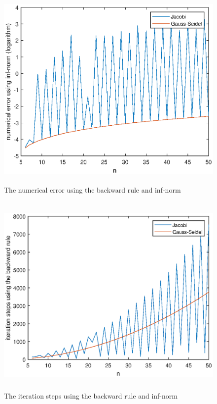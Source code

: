 \documentclass[UTF8,a4paper,10pt]{ctexart}
\begin{document}
\begin{figure}[ht]
    \centering
    \includegraphics[width=14cm,height=10cm]{2.1_error_backward_inf.eps}
    \caption{The numerical error using the backward rule and inf-norm}
\end{figure}
\begin{figure}[ht]
    \centering
    \includegraphics[width=14cm,height=10cm]{2.1_steps_backward_inf.eps}
    \caption{The iteration steps using the backward rule and inf-norm}
\end{figure}
\end{document}
